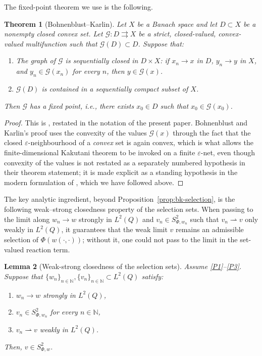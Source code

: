 \documentclass[11pt]{elsarticle}
\newtheorem{theorem}{Theorem}[section]
\newtheorem{lemma}[theorem]{Lemma}
\theoremstyle{definition}
\theoremstyle{remark}
\numberwithin{equation}{section}
\begin{document}
The fixed-point theorem we use is the following.

\begin{theorem}[Bohnenblust--Karlin]
	\label{thm:bk-fixed-point}
	Let $X$ be a Banach space and let $D\subset X$ be a nonempty closed
	convex set. Let $\mathcal{G}:D\rightrightarrows X$ be a strict, closed-valued, convex-valued multifunction such that
	$\mathcal{G}(D)\subset D$. Suppose that:
	\begin{enumerate}
		\item[\textup{(a)}] The graph of $\mathcal{G}$ is sequentially
		closed in $D\times X$: if $x_n\to x$ in $D$, $y_n\to y$ in $X$,
		and $y_n\in\mathcal{G}(x_n)$ for every $n$, then
		$y\in\mathcal{G}(x)$.
		\item[\textup{(b)}] $\mathcal{G}(D)$ is contained in a
		sequentially compact subset of $X$.
	\end{enumerate}
	Then $\mathcal{G}$ has a fixed point, i.e., there exists $x_0\in D$ such that
	$x_0\in\mathcal{G}(x_0)$.
\end{theorem}

\begin{proof}
	This is \cite[Theorem~4, p.~159]{bohnenblust_karlin_1950}, restated
	in the notation of the present paper. Bohnenblust and Karlin's proof
	uses the convexity of the values $\mathcal{G}(x)$ through the fact
	that the closed $\varepsilon$-neighbourhood of a \emph{convex} set is
	again convex, which is what allows the finite-dimensional Kakutani
	theorem to be invoked on a finite $\varepsilon$-net, even though
	convexity of the values is not restated as a separately numbered
	hypothesis in their theorem statement; it is made explicit as a
	standing hypothesis in the modern formulation of \cite[Corollary~9.8, p.\,452]{Zeidler1986}, which we have followed above.
\end{proof}

The key analytic ingredient, beyond Proposition~\ref{prop:bk-selection},
is the following weak--strong closedness property of the selection sets.
When passing to the limit along $w_n\to w$ strongly in $L^2(Q)$ and
$v_n\in S^2_{\Phi,w_n}$ such that $v_n\rightharpoonup v$ only weakly in
$L^2(Q)$, it guarantees that the weak limit $v$ remains an admissible
selection of $\Phi(w(\cdot,\cdot))$; without it, one could not pass to
the limit in the set-valued reaction term.

\begin{lemma}[Weak-strong closedness of the selection sets]
	\label{lem:bk-weak-closedness}
	Assume {\rm \ref{P1}--\ref{P3}}. Suppose that
	$\{w_n\}_{n\in\mathbb{N}},\{v_n\}_{n\in\mathbb{N}}\subset L^2(Q)$
	satisfy:
	\begin{enumerate}
		\item[\textup{(i)}] $w_n\to w$ strongly in $L^2(Q)$,
		\item[\textup{(ii)}] $v_n\in S^2_{\Phi,w_n}$ for every
		$n\in\mathbb{N}$,
		\item[\textup{(iii)}] $v_n\rightharpoonup v$ weakly in $L^2(Q)$.
	\end{enumerate}
	Then, $v\in S^2_{\Phi,w}$.
\end{lemma}
\end{document}

